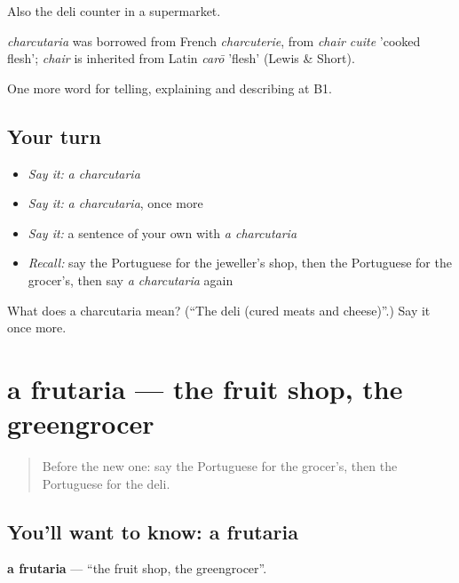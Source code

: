 Also the deli counter in a supermarket.

\begin{cousinweb}
\emph{charcutaria} was borrowed from French \emph{charcuterie}, from \emph{chair cuite} 'cooked flesh'; \emph{chair} is inherited from Latin \emph{carō} 'flesh' (Lewis \& Short).
\end{cousinweb}

\begin{grammarlens}[title={What you've built}]
One more word for telling, explaining and describing at B1.
\end{grammarlens}

\subsection*{Your turn}
\begin{itemize}
\raggedright
  \item \emph{Say it:} \emph{a charcutaria}
  \item \emph{Say it:} \emph{a charcutaria}, once more
  \item \emph{Say it:} a sentence of your own with \emph{a charcutaria}
  \item \emph{Recall:} say the Portuguese for the jeweller's shop, then the Portuguese for the grocer's, then say \emph{a charcutaria} again
\end{itemize}

\begin{tcolorbox}[breakable,colback=teal!4,colframe=teal!35!black,title={Before you move on}]
What does a charcutaria mean? (\textquotedblleft{}The deli (cured meats and cheese)\textquotedblright{}.) Say it once more.
\end{tcolorbox}
\section[a frutaria]{a frutaria — the fruit shop, the greengrocer}

\label{lesson:PT-C450-frutaria}



\begin{quote}
Before the new one: say the Portuguese for the grocer's, then the Portuguese for the deli.
\end{quote}

\subsection*{You'll want to know: a frutaria}
\textbf{a frutaria} — \textquotedblleft{}the fruit shop, the greengrocer\textquotedblright{}.

